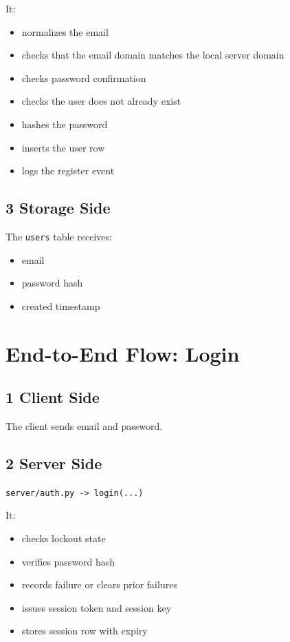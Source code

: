 \documentclass[11pt,a4paper]{article}
\begin{document}
It:

\begin{itemize}
\item normalizes the email
\item checks that the email domain matches the local server domain
\item checks password confirmation
\item checks the user does not already exist
\item hashes the password
\item inserts the user row
\item logs the register event
\end{itemize}

\subsection{3 Storage Side}

The \nolinkurl{users} table receives:

\begin{itemize}
\item email
\item password hash
\item created timestamp
\end{itemize}


\section{End-to-End Flow: Login}

\subsection{1 Client Side}

The client sends email and password.

\subsection{2 Server Side}

\nolinkurl{server/auth.py -> login(...)}

It:

\begin{itemize}
\item checks lockout state
\item verifies password hash
\item records failure or clears prior failures
\item issues session token and session key
\item stores session row with expiry
\end{itemize}
\end{document}
